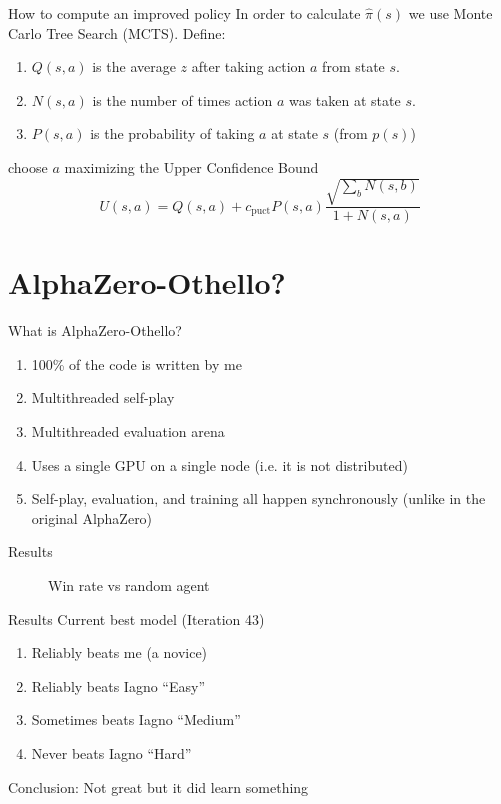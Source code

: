 \documentclass{beamer}
\begin{document}
\begin{frame}{How to compute an improved policy}
  In order to calculate \(\hat{\pi}(s)\) we use Monte Carlo Tree Search (MCTS). Define:
  \begin{enumerate}
  \item $Q(s, a)$ is the average \(z\) after taking action $a$ from state $s$.
  \item $N(s, a)$ is the number of times action $a$ was taken at state $s$.
  \item $P(s, a)$ is the probability of taking \(a\) at state \(s\) (from \(p(s)\))
  \end{enumerate}
  choose \(a\) maximizing the Upper Confidence Bound
  \[U(s, a) = Q(s, a) + c_{\mathrm{puct}} P(s, a)\frac{\sqrt{\sum_b N(s, b)}}{1 + N(s, a)}\]
\end{frame}

\section{AlphaZero-Othello?}
\begin{frame}{What is AlphaZero-Othello?}
  \begin{enumerate}
  \item 100\% of the code is written by me
  \item Multithreaded self-play
  \item Multithreaded evaluation arena
  \item Uses a single GPU on a single node (i.e. it is not distributed)
  \item Self-play, evaluation, and training all happen synchronously (unlike in the original AlphaZero)
  \end{enumerate}
\end{frame}

\begin{frame}{Results}
  \begin{figure}
    \centering
    \resizebox{0.8\textwidth}{!}{}
    \caption{Win rate vs random agent}
    \label{fig:wr}
  \end{figure}
\end{frame}

\begin{frame}{Results}
  Current best model (Iteration 43)
  \begin{enumerate}
  \item Reliably beats me (a novice)
  \item Reliably beats Iagno ``Easy''
  \item Sometimes beats Iagno ``Medium''
  \item Never beats Iagno ``Hard''
  \end{enumerate}
  Conclusion: Not great but it did learn something
\end{frame}
\end{document}
